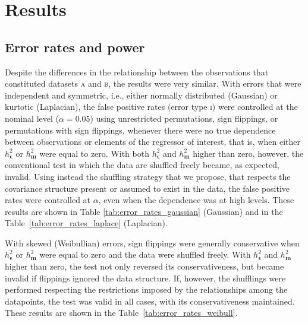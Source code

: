\section{Results}

\subsection{Error rates and power}

Despite the differences in the relationship between the observations that constituted datasets \textsc{a} and \textsc{b}, the results were very similar. With errors that were independent and symmetric, i.e., either normally distributed (Gaussian) or kurtotic (Laplacian), the false positive rates (error type \textsc{i}) were controlled at the nominal level ($\alpha = 0.05$) using unrestricted permutations, sign flippings, or permutations with sign flippings, whenever there were no true dependence between observations or elements of the regressor of interest, that is, when either $h_{\boldsymbol{\epsilon}}^{2}$ or $h_{\mathbf{m}}^{2}$ were equal to zero. With both $h_{\boldsymbol{\epsilon}}^{2}$ and $h_{\mathbf{m}}^{2}$ higher than zero, however, the conventional test in which the data are shuffled freely became, as expected, invalid. Using instead the shuffling strategy that we propose, that respects the covariance structure present or assumed to exist in the data, the false positive rates were controlled at $\alpha$, even when the dependence was at high levels. These results are shown in Table \ref{tab:error_rates_gaussian} (Gaussian) and in the Table~\ref{tab:error_rates_laplace} (Laplacian).

With skewed (Weibullian) errors, sign flippings were generally conservative when $h_{\boldsymbol{\epsilon}}^{2}$ or $h_{\mathbf{m}}^{2}$ were equal to zero and the data were shuffled freely. With $h_{\boldsymbol{\epsilon}}^{2}$ and $h_{\mathbf{m}}^{2}$ higher than zero, the test not only reversed its conservativeness, but became invalid if flippings ignored the data structure. If, however, the shufflings were performed respecting the restrictions imposed by the relationships among the datapoints, the test was valid in all cases, with its conservativeness maintained. These results are shown in the Table~\ref{tab:error_rates_weibull}.


